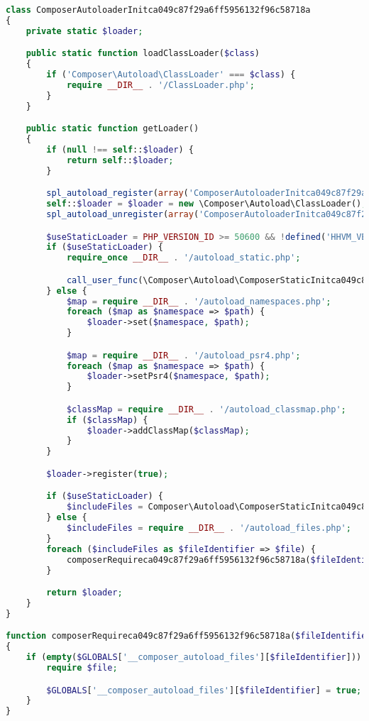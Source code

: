 \begin{lstlisting}[language=PHP]
class ComposerAutoloaderInitca049c87f29a6ff5956132f96c58718a
{
    private static $loader;

    public static function loadClassLoader($class)
    {
        if ('Composer\Autoload\ClassLoader' === $class) {
            require __DIR__ . '/ClassLoader.php';
        }
    }

    public static function getLoader()
    {
        if (null !== self::$loader) {
            return self::$loader;
        }

        spl_autoload_register(array('ComposerAutoloaderInitca049c87f29a6ff5956132f96c58718a', 'loadClassLoader'), true, true);
        self::$loader = $loader = new \Composer\Autoload\ClassLoader();
        spl_autoload_unregister(array('ComposerAutoloaderInitca049c87f29a6ff5956132f96c58718a', 'loadClassLoader'));

        $useStaticLoader = PHP_VERSION_ID >= 50600 && !defined('HHVM_VERSION');
        if ($useStaticLoader) {
            require_once __DIR__ . '/autoload_static.php';

            call_user_func(\Composer\Autoload\ComposerStaticInitca049c87f29a6ff5956132f96c58718a::getInitializer($loader));
        } else {
            $map = require __DIR__ . '/autoload_namespaces.php';
            foreach ($map as $namespace => $path) {
                $loader->set($namespace, $path);
            }

            $map = require __DIR__ . '/autoload_psr4.php';
            foreach ($map as $namespace => $path) {
                $loader->setPsr4($namespace, $path);
            }

            $classMap = require __DIR__ . '/autoload_classmap.php';
            if ($classMap) {
                $loader->addClassMap($classMap);
            }
        }

        $loader->register(true);

        if ($useStaticLoader) {
            $includeFiles = Composer\Autoload\ComposerStaticInitca049c87f29a6ff5956132f96c58718a::$files;
        } else {
            $includeFiles = require __DIR__ . '/autoload_files.php';
        }
        foreach ($includeFiles as $fileIdentifier => $file) {
            composerRequireca049c87f29a6ff5956132f96c58718a($fileIdentifier, $file);
        }

        return $loader;
    }
}

function composerRequireca049c87f29a6ff5956132f96c58718a($fileIdentifier, $file)
{
    if (empty($GLOBALS['__composer_autoload_files'][$fileIdentifier])) {
        require $file;

        $GLOBALS['__composer_autoload_files'][$fileIdentifier] = true;
    }
}
\end{lstlisting}

